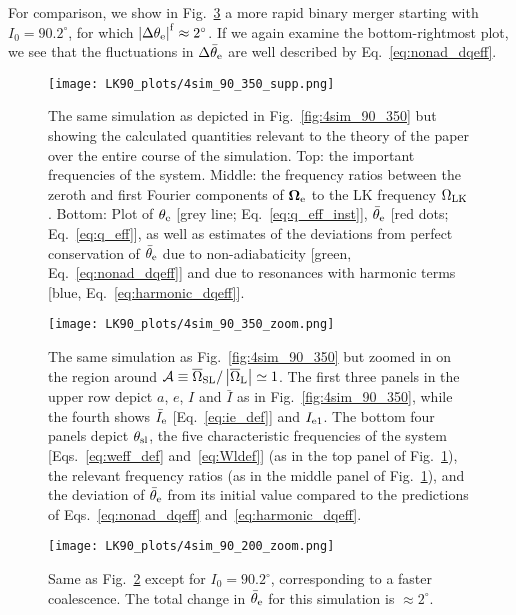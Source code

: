 \documentclass[
        twocolumn,
        twocolappendix
    ]{aastex63}
\newcommand*{\abs}[1]{\left|#1\right|}
\renewcommand*{\bm}[1]{\boldsymbol{\mathbf{#1}}}
\begin{document}
For comparison, we show in Fig.~\ref{fig:4sim_90_200_zoom} a more rapid
binary merger starting with $I_0 = 90.2^\circ$, for which $\abs{\Delta
\theta_{\rm e}}^{\rm f} \approx 2^\circ$. If we again examine the
bottom-rightmost plot, we see that the fluctuations in $\Delta \bar{\theta}_{\rm
e}$ are well described by Eq.~\eqref{eq:nonad_dqeff}.

\begin{figure}
    \centering
    \texttt{[image: LK90\_plots/4sim\_90\_350\_supp.png]}
    \caption{The same simulation as depicted in Fig.~\ref{fig:4sim_90_350} but
    showing the calculated quantities relevant to the theory of the paper over
    the entire course of the simulation. Top: the important frequencies of the
    system. Middle: the frequency ratios between the zeroth and first Fourier
    components of $\bm{\Omega}_{\rm e}$ to the LK frequency $\Omega_{\rm LK}$.
    Bottom: Plot of $\theta_{\rm e}$ [grey line; Eq.~\eqref{eq:q_eff_inst}],
    $\bar{\theta}_{\rm e}$ [red dots; Eq.~\eqref{eq:q_eff}], as well as
    estimates of the deviations from perfect conservation of $\bar{\theta}_{\rm
    e}$ due to non-adiabaticity [green, Eq.~\eqref{eq:nonad_dqeff}] and due
    to resonances with harmonic terms [blue,
    Eq.~\eqref{eq:harmonic_dqeff}].}\label{fig:4sim_90_350_supp}
\end{figure}
\begin{figure*}
    \centering
    \texttt{[image: LK90\_plots/4sim\_90\_350\_zoom.png]}
    \caption{The same simulation as Fig.~\ref{fig:4sim_90_350} but zoomed in on
    the region around $\mathcal{A} \equiv \overline{\Omega}_{\rm SL} /
    \abs{\overline{\Omega}_{\rm L}} \simeq 1$. The first three panels in the
    upper row depict $a$, $e$, $I$ and $\bar{I}$ as in
    Fig.~\ref{fig:4sim_90_350}, while the fourth shows $\bar{I}_{\rm e}$
    [Eq.~\eqref{eq:ie_def}] and $I_{\rm e1}$. The bottom four panels depict
    $\theta_{\rm sl}$, the five characteristic frequencies of the system
    [Eqs.~\ref{eq:weff_def} and~\eqref{eq:Wldef}] (as in the top panel of
    Fig.~\ref{fig:4sim_90_350_supp}), the relevant frequency ratios (as in the
    middle panel of Fig.~\ref{fig:4sim_90_350_supp}), and the deviation of
    $\bar{\theta}_{\rm e}$ from its initial value compared to the predictions of
    Eqs.~\eqref{eq:nonad_dqeff}
    and~\eqref{eq:harmonic_dqeff}.}\label{fig:4sim_90_350_zoom}
\end{figure*}

\begin{figure*}
    \centering
    \texttt{[image: LK90\_plots/4sim\_90\_200\_zoom.png]}
    \caption{Same as Fig.~\ref{fig:4sim_90_350_zoom} except for $I_0 =
    90.2^\circ$, corresponding to a faster coalescence. The total
    change in $\bar{\theta}_{\rm e}$ for this simulation is $\approx
    2^\circ$.}\label{fig:4sim_90_200_zoom}
\end{figure*}
\end{document}
